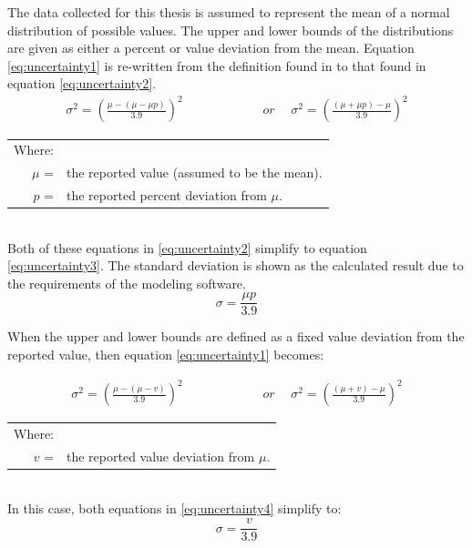 \begin{linenumbers}
The data collected for this thesis is assumed to represent the mean of a normal distribution of possible values.  The upper and lower bounds of the distributions are given as either a percent or value deviation from the mean.  Equation \ref{eq:uncertainty1} is re-written from the definition found in \textcite{harmel2007} to that found in equation \ref{eq:uncertainty2}.
\begin{align}
	\sigma^2 = \left( \frac{\mu - (\mu - \mu p)}{3.9} \right)^2  &  \phantom{wordsssssss} or \phantom{s}  & 	\sigma^2 = \left( \frac{(\mu + \mu p) - \mu}{3.9} \right)^2 \label{eq:uncertainty2}
\end{align}

\begin{tabular}{r p{5in}}
	Where:\\
	$ \mu $ = & the reported value (assumed to be the mean).\\
	$ p $ = & the reported percent deviation from $ \mu $.\\
\end{tabular}\\

Both of these equations in \ref{eq:uncertainty2} simplify to equation \ref{eq:uncertainty3}.  The standard deviation is shown as the calculated result due to the requirements of the modeling software.
\begin{equation}
\sigma = \frac{\mu p}{3.9}
\label{eq:uncertainty3}
\end{equation}

When the upper and lower bounds are defined as a fixed value deviation from the reported value, then equation \ref{eq:uncertainty1} becomes:

\begin{align}
	\sigma^2 = \left( \frac{\mu - (\mu - v)}{3.9} \right)^2  &  \phantom{wordsssssss} or \phantom{s}  & 	\sigma^2 = \left( \frac{(\mu + v) - \mu}{3.9} \right)^2 \label{eq:uncertainty4}
\end{align}
\begin{tabular}{r p{5in}}
	Where:\\
	$ v $ = & the reported value deviation from $ \mu $.\\
\end{tabular}\\

In this case, both equations in \ref{eq:uncertainty4} simplify to:
\begin{equation}
\sigma = \frac{v}{3.9}
\label{eq:uncertainty5}
\end{equation}


\end{linenumbers}
